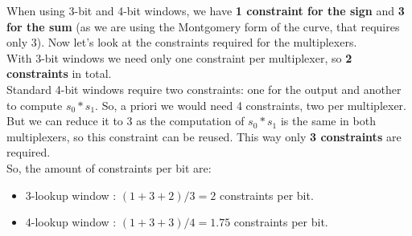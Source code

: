 


When using 3-bit and 4-bit windows, we have {{\bf 1 constraint for the sign}} and {{\bf 3 for the sum}} (as we are using the Montgomery form of the curve, that requires only 3). Now let's look at the constraints required for the multiplexers. \\

With 3-bit windows we need only one constraint per multiplexer, so {\bf 2 constraints} in total. \\

Standard 4-bit windows require two constraints: one for the output and another to compute $s_0*s_1$. So, a priori we would need 4 constraints, two per multiplexer. But we can reduce it to 3 as the computation of $s_0*s_1$ is the same in both multiplexers, so this constraint can be reused. This way only {{\bf 3 constraints}} are required. \\

So, the amount of constraints per bit are:
\begin{itemize}
	\item 3-lookup window : %
		$ (1+3+2)/3 = 2 $ constraints per bit.
	\item 4-lookup window : %
		$ (1 +3+3)/4 = 1.75 $ constraints per bit. 
\end{itemize}

